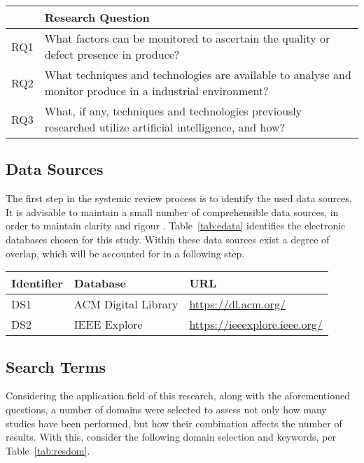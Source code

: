 \documentclass[conference]{IEEEtran}
\begin{document}
\begin{table*}
    \caption{Research Questions}
    \label{tab:resquest}

    \begin{tabular}{ll}
    \hline
        & \textbf{Research Question}\\
    \hline
        RQ1 & What factors can be monitored to ascertain the quality or defect presence in produce? \\
        RQ2 &  What techniques and technologies are available to analyse and monitor produce in a industrial environment?\\
        RQ3 & What, if any, techniques and technologies previously researched utilize artificial intelligence, and how? \\
    \hline
    \end{tabular}
\end{table*}

\subsection{Data Sources}

The first step in the systemic review process is to identify the used data sources. It is advisable
to maintain a small number of comprehensible data sources, in order to maintain clarity and rigour \cite{Par2015}. Table~\ref{tab:edata} identifies the electronic databases chosen for this study. Within these data sources exist a degree of overlap, which will be accounted for in a following step.

\begin{table*}
    \caption{Electronic databases}
    \label{tab:edata}

    \begin{tabular}{lll}
    \hline
        Identifier & Database & URL \\
    \hline
        DS1 & ACM Digital Library & \url{https://dl.acm.org/} \\
        DS2 & IEEE Explore & \url{https://ieeexplore.ieee.org/} \\
    \hline

    \hline
    \end{tabular}
\end{table*}

\subsection{Search Terms}

Considering the application field of this research, along with the aforementioned questions, a number of domains were selected to assess not only how many studies have been performed, but how their combination affects the number of results. With this, consider the following domain selection and keywords, per Table~\ref{tab:resdom}.
\end{document}
